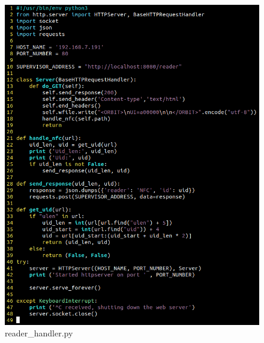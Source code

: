 \documentclass[times, utf8, zavrsni]{fer}
\begin{document}
\begin{figure}[h]
\includegraphics[scale=0.5]{nfchandler.png}
\centering
\caption{reader\_handler.py}
\centering
\end{figure}
\end{document}
